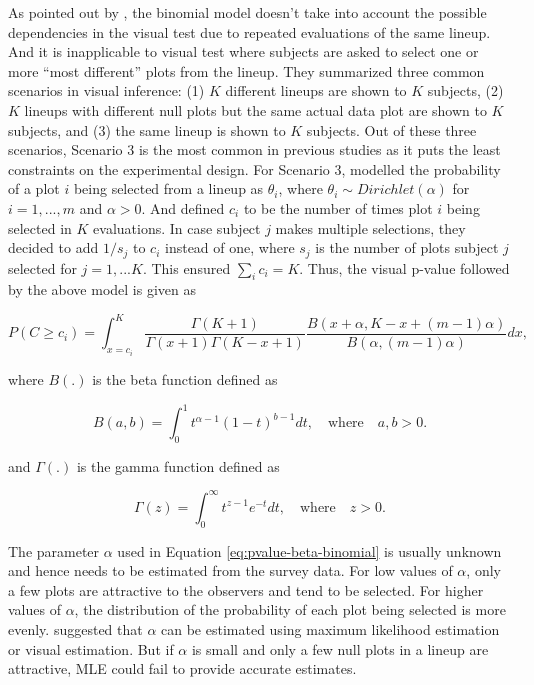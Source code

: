 \documentclass[]{interact}
\theoremstyle{plain}%
\theoremstyle{definition}
\theoremstyle{remark}
\begin{document}
As pointed out by \citet{vanderplas2021statistical}, the binomial model
doesn't take into account the possible dependencies in the visual test
due to repeated evaluations of the same lineup. And it is inapplicable
to visual test where subjects are asked to select one or more ``most
different'' plots from the lineup. They summarized three common
scenarios in visual inference: (1) \(K\) different lineups are shown to
\(K\) subjects, (2) \(K\) lineups with different null plots but the same
actual data plot are shown to \(K\) subjects, and (3) the same lineup is
shown to \(K\) subjects. Out of these three scenarios, Scenario 3 is the
most common in previous studies as it puts the least constraints on the
experimental design. For Scenario 3, \citet{vanderplas2021statistical}
modelled the probability of a plot \(i\) being selected from a lineup as
\(\theta_i\), where \(\theta_i \sim Dirichlet(\alpha)\) for
\(i=1,...,m\) and \(\alpha > 0\). And defined \(c_i\) to be the number
of times plot \(i\) being selected in \(K\) evaluations. In case subject
\(j\) makes multiple selections, they decided to add \(1/s_j\) to
\(c_i\) instead of one, where \(s_j\) is the number of plots subject
\(j\) selected for \(j=1,...K\). This ensured \(\sum_{i}c_i=K\). Thus,
the visual p-value followed by the above model is given as

\begin{equation} \label{eq:pvalue-beta-binomial}
P(C \geq c_i) = \int_{x=c_i}^{K}\frac{\Gamma(K + 1)}{\Gamma(x + 1)\Gamma(K - x + 1)}\frac{B(x + \alpha, K - x + (m - 1)\alpha)}{B(\alpha, (m-1)\alpha)}dx,
\end{equation}

where \(B(.)\) is the beta function defined as

\begin{equation} \label{eq:betafunction}
B(a, b) = \int_{0}^{1}t^{\alpha - 1}(1-t)^{b-1}dt,\quad \text{where}\quad a,b>0. 
\end{equation}

and \(\Gamma(.)\) is the gamma function defined as

\begin{equation} \label{eq:gammafunction}
\Gamma(z) = \int_{0}^{\infty}t^{z - 1}e^{-t}dt,\quad \text{where}\quad z>0. 
\end{equation}

The parameter \(\alpha\) used in Equation \ref{eq:pvalue-beta-binomial}
is usually unknown and hence needs to be estimated from the survey data.
For low values of \(\alpha\), only a few plots are attractive to the
observers and tend to be selected. For higher values of \(\alpha\), the
distribution of the probability of each plot being selected is more
evenly. \citet{vanderplas2021statistical} suggested that \(\alpha\) can
be estimated using maximum likelihood estimation or visual estimation.
But if \(\alpha\) is small and only a few null plots in a lineup are
attractive, MLE could fail to provide accurate estimates.
\end{document}
